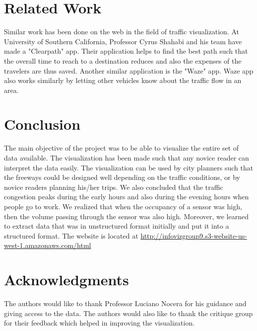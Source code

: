 \documentclass{llncs}
\begin{document}
\section{Related Work}\label{sec: Related Work}
Similar work has been done on the web in the field of traffic visualization. At University of Southern California, Professor Cyrus Shahabi and his team have made a "Clearpath" app. Their application helps to find the best path such that the overall time to reach to a destination reduces and also the expenses of the travelers are thus saved. Another similar application is the "Waze" app. Waze app also works similarly by letting other vehicles know about the traffic flow in an area.

\section{Conclusion}\label{sec:Conclusion}

The main objective of the project was to be able to visualize the entire set of data available. The visualization has been made such that any novice reader can interpret the data easily. The visualization can be used by city planners such that the freeways could be designed well depending on the traffic conditions, or by novice readers planning his/her trips. We also concluded that the traffic congestion peaks during the early hours and also during the evening hours when people go to work. We realized that when the occupancy of a sensor was high, then the volume passing through the sensor was also high. Moreover, we learned to extract data that was in unstructured format initially and put it into a structured format. The website is located at \url{http://infovizgroup9.s3-website-us-west-1.amazonaws.com/html}

\section*{Acknowledgments}\label{sec:Acknowledgments}

The authors would like to thank Professor Luciano Nocera for his guidance and giving access to the data. The authors would also like to thank the critique group for their feedback which helped in improving the visualization.


 
\nocite{*}
\end{document}
